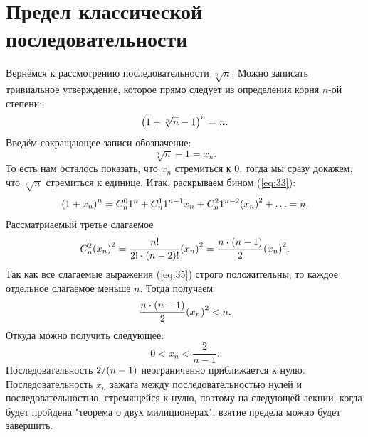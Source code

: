 \documentclass[12pt]{article}
\begin{document}
\section{Предел классической последовательности}
Вернёмся к рассмотрению последовательности $\sqrt[n]{n}$. Можно записать тривиальное утверждение, которое прямо следует из определения корня $n$\--ой степени:
\begin{equation}\label{eq:33}
    \qty(1+ \sqrt[n]{n} - 1)^n = n.
\end{equation}
Введём сокращающее записи обозначение:
\begin{equation}
    \sqrt[n]{n} - 1 = x_n.
\end{equation}
То есть нам осталось показать, что $x_n$ стремиться к $0$, тогда мы сразу докажем, что $\sqrt[n]{n}$ стремиться к единице. Итак, раскрываем бином (\ref{eq:33}):
\begin{equation}\label{eq:35}
    \qty(1+x_n)^n = C_n^0 1^n + C_n^1 1^{n-1} x_n + C_n^2 1^{n-2} \qty(x_n)^2 + \ldots = n.
\end{equation}
Рассматриаемый третье слагаемое
\begin{equation}
    C_n^2 \qty(x_n)^2 = \dfrac{n!}{2!\vdot \qty(n-2)!} \qty(x_n)^2 = \dfrac{n\vdot \qty(n-1)}{2} \qty(x_n)^2.
\end{equation}
Так как все слагаемые выражения (\ref{eq:35}) строго положительны, то каждое отдельное слагаемое меньше $n$. Тогда получаем
\begin{equation}
    \dfrac{n\vdot \qty(n-1)}{2} \qty(x_n)^2 < n.
\end{equation}
Откуда можно получить следующее:
\begin{equation}
    0 < x_n < \dfrac{2}{n-1}.
\end{equation}
Последовательность $2/\qty(n-1)$ неограниченно приближается к нулю. Последовательность $x_n$ зажата между последовательностью нулей и последовательностью, стремящейся к нулю, поэтому на следующей лекции, когда будет пройдена "теорема о двух милиционерах"{}, взятие предела можно будет завершить.
\end{document}
